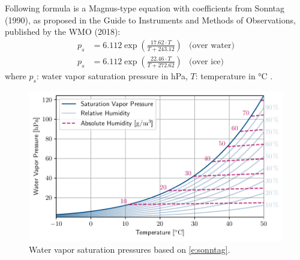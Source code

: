 Following formula is a Magnus-type equation with coefficients from Sonntag (1990), as proposed in the Guide to Instruments and Methods of Observations, published by the \gls{WMO} (2018):
\begin{subequations}
\begin{align}
    p_s &= 6.112 \exp\left(\frac{17.62 \cdot T}{T + 243.12}\right) & \text{(over water)} \\
    p_s &= 6.112 \exp\left(\frac{22.46 \cdot T}{T + 272.62}\right) & \text{(over ice)}
\end{align}
\end{subequations}
where 
$p_s$: water vapor saturation pressure in \unit{\hecto\pascal}, 
$T$: temperature in \unit{\celsius} \autocite{worldmeteorologicalorganizationMeasurementMeteorologicalVariables2018}.


\begin{figure}[h]
    \centering
    \includegraphics[width=1\textwidth]{graphs/saturation_pressure_chart.pdf}
    \caption{Water vapor saturation pressures based on \cref{e:sonntag}.}
\end{figure}

